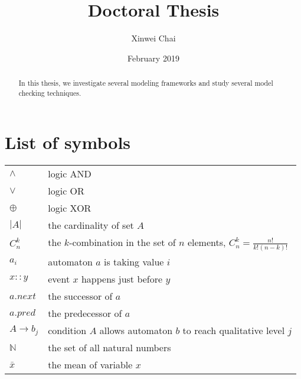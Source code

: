 \documentclass[12pt]{report}
\title{Doctoral Thesis}
\date{February 2019}
\author{Xinwei Chai}
\theoremstyle{definition}
\begin{document}
\maketitle
\tableofcontents
\listoffigures
\listoftables
\begin{abstract}
In this thesis, we investigate several modeling frameworks and study several model checking techniques.
\end{abstract}

\chapter*{List of symbols}
\begin{tabular}{l|l}
    $\land$ & logic AND\\
    $\lor$ & logic OR\\
    $\oplus$ & logic XOR\\
    $|A|$ & the cardinality of set $A$\\
    $C_n^k$& the $k$-combination in the set of $n$ elements, $C_n^k=\frac {n!}{k!(n-k)!}$\\
    $a_i$  & automaton $a$ is taking value $i$ \\
    $x::y$ & event $x$ happens just before $y$\\
    $a.next$&the successor of $a$\\
    $a.pred$ & the predecessor of $a$\\
    $A\to b_j$ & condition $A$ allows automaton $b$ to reach qualitative level $j$\\
    $\mathbb{N}$ & the set of all natural numbers\\
    $\bar{x}$ & the mean of variable $x$
\end{tabular}






















\appendix

\end{document}
